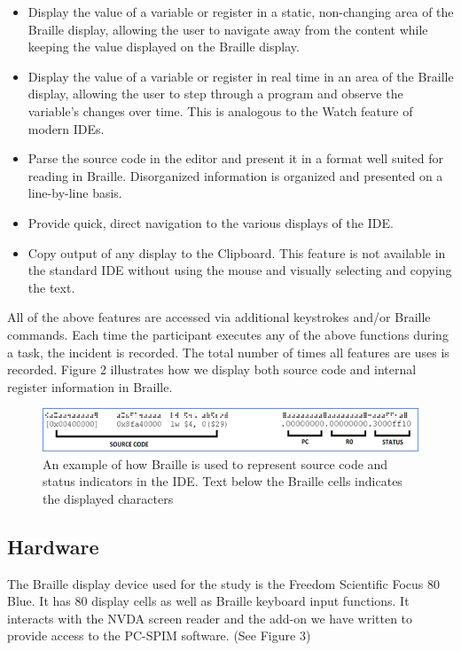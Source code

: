 \documentclass[11.5pt]{sig-alternate} %
\begin{document}
\begin{large}
\begin{itemize}
    \item Display the value of a variable or register in a static, non-changing area of the Braille display, allowing the user to navigate away from the content while keeping the value displayed on the Braille display.
    \item Display the value of a variable or register in real time in an area of the Braille display, allowing the user to step through a program and observe the variable’s changes over time. This is analogous to the Watch feature of modern IDEs.
    \item Parse the source code in the editor and present it in a format well suited for reading in Braille. Disorganized information is organized and presented on a line-by-line basis.
    \item Provide quick, direct navigation to the various displays of the IDE.
    \item Copy output of any display to the Clipboard. This feature is not available in the standard IDE without using the mouse and visually selecting and copying the text.
\end{itemize}

All of the above features are accessed via additional keystrokes and/or Braille commands. Each time the participant executes any of the above functions during a task, the incident is recorded. The total number of times all features are uses is recorded. Figure 2 illustrates how we display both source code and internal register information in Braille.

\begin{figure}[!th]
    \centering
    \includegraphics[width=1\linewidth]{images/fig2.png}
    \caption{An example of how Braille is used to represent source code and status indicators in the IDE. Text below the Braille cells indicates the displayed characters}
\end{figure}

\subsection*{Hardware}

The Braille display device used for the study is the Freedom Scientific Focus 80 Blue. It has 80 display cells as well as Braille keyboard input functions. It interacts with the NVDA screen reader and the add-on we have written to provide access to the PC-SPIM software. (See Figure 3)


\end{large}
\end{document}
